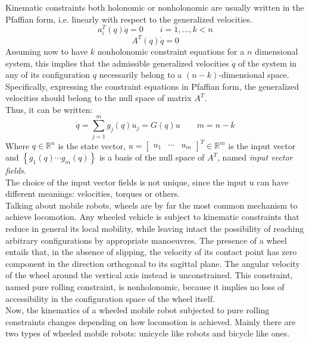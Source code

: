 Kinematic constraints both holonomic or nonholonomic are usually written in the Pfaffian form, i.e. linearly with respect to the generalized velocities.
\begin{equation}
a_i^T \left( q \right)\dot{q} =0 \qquad i=1,...,k<n 
\end{equation}
\begin{equation*} 
A^T \left( q \right)\dot{q} =0  
\end{equation*}
Assuming now to have $k$ nonholonomic constraint equations for a $n$ dimensional system, this implies that the admissible generalized velocities $\dot{q}$ of the system in any of its configuration $q$ necessarily belong to a $(n-k)$-dimensional space. Specifically, expressing the constraint equations in Pfaffian form, the generalized velocities should belong to the null space of matrix $A^T$.\\
Thus, it can be written:
\begin{equation} \label{G}
\dot{q}=\sum_{j=1}^{m} g_j(q)u_j=G(q)u \qquad m=n-k
\end{equation}
Where $q\in \mathbb{R}^n $ is the state vector, $u= \left[
\begin{matrix}
u_1 &  \cdots & u_m
\end{matrix}
\right]^T\in\mathbb{R}^m $ is the input vector and $\left\lbrace  g_1 (q) \cdots g_m (q) \right\rbrace $ is a basis of the null space of $A^T$, named \textit{input vector fields}. \\
The choice of the input vector fields is not unique, since the input u can have different meanings: velocities, torques or others.\\ 
Talking about mobile robots, wheels are by far the most common mechanism to achieve locomotion. Any wheeled vehicle is subject to kinematic constraints that reduce in general its local mobility, while leaving intact the possibility of reaching arbitrary configurations by appropriate manoeuvres. The presence of a wheel entails that, in the absence of slipping, the velocity of its contact point has zero component in the direction orthogonal to its sagittal plane. The angular velocity of the wheel around the vertical axis instead is unconstrained.
This constraint, named pure rolling constraint, is nonholonomic, because it implies no loss of accessibility in the configuration space of the wheel itself.\\
Now, the kinematics of a wheeled mobile robot subjected to pure rolling constraints changes depending on how locomotion is achieved. Mainly there are two types of wheeled mobile robots: unicycle like robots and bicycle like ones.

